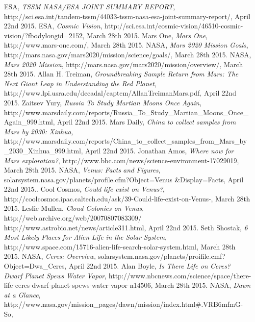 \begin{thebibliography}{99}
		ESA,
		\emph{TSSM NASA/ESA JOINT SUMMARY REPORT},
		http://sci.esa.int/tandem-tssm/44033-tssm-nasa-esa-joint-summary-report/,
		April 22nd 2015.
		ESA,
		\emph{Cosmic Vision},
		http://sci.esa.int/cosmic-vision/46510-cosmic-vision/?fbodylongid=2152,
		March 28th 2015.
		Mars One,
		\emph{Mars One},
		http://www.mars-one.com/,
		March 28th 2015.
		NASA,
		\emph{Mars 2020 Mission Goals},
		http://mars.nasa.gov/mars2020/mission/science/goals/,
		March 28th 2015.
		NASA,
		\emph{Mars 2020 Mission},
		http://mars.nasa.gov/mars2020/mission/overview/,
		March 28th 2015.
		Allan H. Treiman,
		\emph{Groundbreaking Sample Return from Mars: The Next Giant Leap in Understanding the Red Planet},
		http://www.lpi.usra.edu/decadal/captem/AllanTreimanMars.pdf,
		April 22nd 2015.
		Zaitsev Yury,
		\emph{Russia To Study Martian Moons Once Again},
		http://www.marsdaily.com/reports/Russia\_To\_Study\_Martian\_Moons\_Once\_Again\_999.html,
		April 22nd 2015.
		Mars Daily,
		\emph{China to collect samples from Mars by 2030: Xinhua},
		http://www.marsdaily.com/reports/China\_to\_collect\_samples\_from\_Mars\_by\_2030\_Xinhua\_999.html,
		April 22nd 2015.
		Jonathan Amos,
		\emph{Where now for Mars exploration?},
		http://www.bbc.com/news/science-environment-17029019,
		March 28th 2015.
		NASA,
		\emph{Venus: Facts and Figures},
		solarsystem.nasa.gov/planets/profile.cfm?Object=Venus \&Display=Facts,
		April 22nd 2015..
		Cool Cosmos,
		\emph{Could life exist on Venus?},
		http://coolcosmos.ipac.caltech.edu/ask/39-Could-life-exist-on-Venus-,
		March 28th 2015.
		Leslie Mullen,
		\emph{Cloud Colonies on Venus},
		http://web.archive.org/web/20070807083309/ http://www.astrobio.net/news/article311.html,
		April 22nd 2015.
		Seth Shostak,
		\emph{6 Most Likely Places for Alien Life in the Solar System},
		http://www.space.com/15716-alien-life-search-solar-system.html,
		March 28th 2015.
		NASA,
		\emph{Ceres: Overview},
		solarsystem.nasa.gov/planets/proifile.cmf?Object=Dwa\_Ceres,
		April 22nd 2015.
		Alan Boyle,
		\emph{Is There Life on Ceres? Dwarf Planet Spews Water Vapor},
		http://www.nbcnews.com/science/space/there-life-ceres-dwarf-planet-spews-water-vapor-n14506,
		March 28th 2015.
		NASA,
		\emph{Dawn at a Glance},
		http://www.nasa.gov/mission\_pages/dawn/mission/index.html\#.VRB6mfmG-So,

\end{thebibliography}
